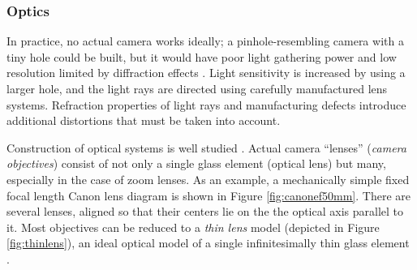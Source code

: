 

\subsubsection{Optics} %

In practice, no actual camera works ideally; a pinhole-resembling camera with a tiny hole could be built, but it would have poor light gathering power and low resolution limited by diffraction effects \cite{greenleaf1950photographic}.
Light sensitivity is increased by using a larger hole, and the light rays are directed using carefully manufactured lens systems.
Refraction properties of light rays and manufacturing defects introduce additional distortions that must be taken into account.

Construction of optical systems is well studied \cite{kingslake1989history,greenleaf1950photographic}.
Actual camera ``lenses'' (\emph{camera objectives}) consist of not only a single glass element (optical lens) but many, especially in the case of zoom lenses.
As an example, a mechanically simple fixed focal length Canon lens diagram is shown in Figure \ref{fig:canonef50mm}.
There are several lenses, aligned so that their centers lie on the the optical axis parallel to it.
Most objectives can be reduced to a \emph{thin lens} model (depicted in Figure \ref{fig:thinlens}), an ideal optical model of a single infinitesimally thin glass element \cite{greenleaf1950photographic,szeliski10vision}.




